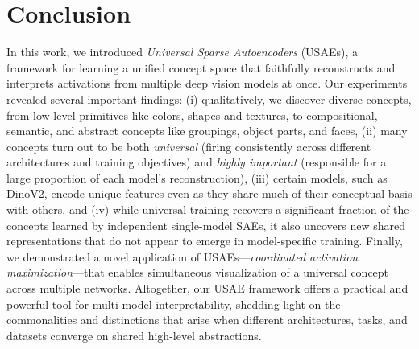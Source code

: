 \vspace{-3.5mm}
\section{Conclusion}
\vspace{-1.5mm}
In this work, we introduced \emph{Universal Sparse Autoencoders} (USAEs), a framework for learning a unified concept space that faithfully reconstructs and interprets activations from multiple deep vision models at once. Our experiments revealed several important findings: (i) qualitatively, we discover diverse concepts, from low-level primitives like colors, shapes and textures, to compositional, semantic, and abstract concepts like groupings, object parts, and faces, (ii) many concepts turn out to be both \emph{universal} (firing consistently across different architectures and training objectives) and \emph{highly important} (responsible for a large proportion of each model’s reconstruction), (iii) certain models, such as DinoV2, encode unique features even as they share much of their conceptual basis with others, and (iv) while universal training recovers a significant fraction of the concepts learned by independent single-model SAEs, it also uncovers new shared representations that do not appear to emerge in model-specific training. Finally, we demonstrated a novel application of USAEs—\emph{coordinated activation maximization}—that enables simultaneous visualization of a universal concept across multiple networks. Altogether, our USAE framework offers a practical and powerful tool for multi-model interpretability, shedding light on the commonalities and distinctions that arise when different architectures, tasks, and datasets converge on shared high-level abstractions.


